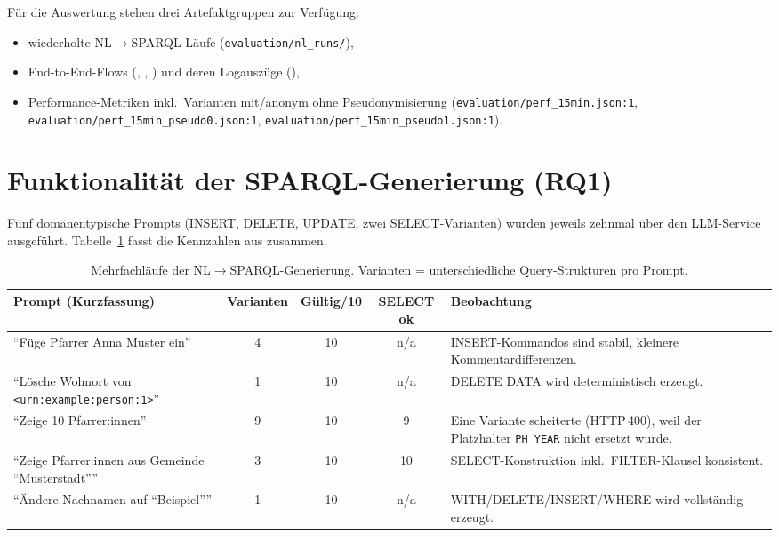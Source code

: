 Für die Auswertung stehen drei Artefaktgruppen zur Verfügung:
\begin{itemize}
  \item wiederholte NL$\rightarrow$SPARQL-Läufe (\texttt{evaluation/nl\_runs/}),
\item End-to-End-Flows (, , ) und deren Logauszüge (),
  \item Performance-Metriken inkl.\ Varianten mit/anonym ohne Pseudonymisierung (\texttt{evaluation/perf\_15min.json:1}, \texttt{evaluation/perf\_15min\_pseudo0.json:1}, \texttt{evaluation/perf\_15min\_pseudo1.json:1}).
\end{itemize}

\section{Funktionalität der SPARQL-Generierung (RQ1)}

Fünf domänentypische Prompts (INSERT, DELETE, UPDATE, zwei SELECT-Varianten) wurden jeweils zehnmal über den LLM-Service ausgeführt. Tabelle~\ref{tab:nl-eval} fasst die Kennzahlen aus  zusammen.

\begin{table}[ht]
  \centering
  \begin{tabularx}{\textwidth}{>{\raggedright\arraybackslash}X c c c >{\raggedright\arraybackslash}X}
    \toprule
    Prompt (Kurzfassung) & Varianten & Gültig/10 & SELECT ok & Beobachtung \\
    \midrule
    \enquote{Füge Pfarrer Anna Muster ein} & 4 & 10 & n/a & INSERT-Kommandos sind stabil, kleinere Kommentardifferenzen.\\
    \enquote{Lösche Wohnort von \texttt{<urn:example:person:1>}} & 1 & 10 & n/a & DELETE DATA wird deterministisch erzeugt.\\
    \enquote{Zeige 10 Pfarrer:innen} & 9 & 10 & 9 & Eine Variante scheiterte (HTTP\,400), weil der Platzhalter \texttt{PH\_YEAR} nicht ersetzt wurde.\\
    \enquote{Zeige Pfarrer:innen aus Gemeinde ``Musterstadt''} & 3 & 10 & 10 & SELECT-Konstruktion inkl.\ FILTER-Klausel konsistent.\\
    \enquote{Ändere Nachnamen auf ``Beispiel''} & 1 & 10 & n/a & WITH/\allowbreak DELETE/\allowbreak INSERT/\allowbreak WHERE wird vollständig erzeugt.\\
    \bottomrule
  \end{tabularx}
  \caption[NL$\rightarrow$SPARQL-Läufe]{Mehrfachläufe der NL$\rightarrow$SPARQL-Generierung. Varianten = unterschiedliche Query-Strukturen pro Prompt.}
  \label{tab:nl-eval}
\end{table}

